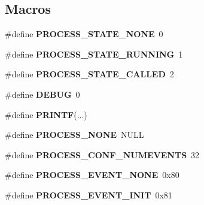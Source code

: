 \subsection*{Macros}
\begin{DoxyCompactItemize}
\item 
\hypertarget{group__process_ga437239861f9ea9ebec1d1226d4d97aa6}{\#define {\bfseries P\-R\-O\-C\-E\-S\-S\-\_\-\-S\-T\-A\-T\-E\-\_\-\-N\-O\-N\-E}~0}\label{group__process_ga437239861f9ea9ebec1d1226d4d97aa6}

\item 
\hypertarget{group__process_ga1a012e4a68ade6aa0eef2ab61b649d8a}{\#define {\bfseries P\-R\-O\-C\-E\-S\-S\-\_\-\-S\-T\-A\-T\-E\-\_\-\-R\-U\-N\-N\-I\-N\-G}~1}\label{group__process_ga1a012e4a68ade6aa0eef2ab61b649d8a}

\item 
\hypertarget{group__process_ga8b440ee2f4859a533b9b2164d252027f}{\#define {\bfseries P\-R\-O\-C\-E\-S\-S\-\_\-\-S\-T\-A\-T\-E\-\_\-\-C\-A\-L\-L\-E\-D}~2}\label{group__process_ga8b440ee2f4859a533b9b2164d252027f}

\item 
\hypertarget{group__process_gad72dbcf6d0153db1b8d8a58001feed83}{\#define {\bfseries D\-E\-B\-U\-G}~0}\label{group__process_gad72dbcf6d0153db1b8d8a58001feed83}

\item 
\hypertarget{group__process_ga1f464e950a4fa11e8821b5c725921a15}{\#define {\bfseries P\-R\-I\-N\-T\-F}(...)}\label{group__process_ga1f464e950a4fa11e8821b5c725921a15}

\item 
\hypertarget{group__process_ga8c1c92ac579df9addba8037625589611}{\#define {\bfseries P\-R\-O\-C\-E\-S\-S\-\_\-\-N\-O\-N\-E}~N\-U\-L\-L}\label{group__process_ga8c1c92ac579df9addba8037625589611}

\item 
\hypertarget{group__process_ga9ab88d3a6c2d13dd59f9d41e1347ad40}{\#define {\bfseries P\-R\-O\-C\-E\-S\-S\-\_\-\-C\-O\-N\-F\-\_\-\-N\-U\-M\-E\-V\-E\-N\-T\-S}~32}\label{group__process_ga9ab88d3a6c2d13dd59f9d41e1347ad40}

\item 
\hypertarget{group__process_ga57de891168a2d72f56213461d9fb0cc9}{\#define {\bfseries P\-R\-O\-C\-E\-S\-S\-\_\-\-E\-V\-E\-N\-T\-\_\-\-N\-O\-N\-E}~0x80}\label{group__process_ga57de891168a2d72f56213461d9fb0cc9}

\item 
\hypertarget{group__process_ga6c18caccfa1f228ca39b41f1be228f91}{\#define {\bfseries P\-R\-O\-C\-E\-S\-S\-\_\-\-E\-V\-E\-N\-T\-\_\-\-I\-N\-I\-T}~0x81}\label{group__process_ga6c18caccfa1f228ca39b41f1be228f91}


\end{DoxyCompactItemize}
